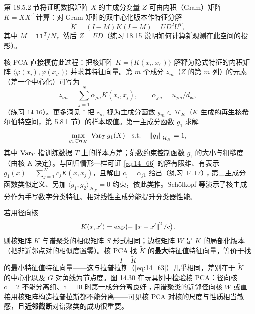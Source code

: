 第 18.5.2 节将证明数据矩阵 $X$ 的主成分变量 $Z$ 可由内积（Gram）矩阵 $K=XX^T$ 计算：对 Gram 矩阵的双中心化版本作特征分解
\begin{equation}
\tilde K = (I-M)K(I-M) = UD^2U^T, \label{eq:14_65}
\end{equation}
其中 $M=\mathbf{1}\mathbf{1}^T/N$，然后 $Z=UD$（练习 18.15 说明如何计算新观测在此空间的投影）。

核 PCA 直接模仿此过程：把核矩阵 $K=\{K(x_i,x_{i'})\}$ 解释为隐式特征的内积矩阵 $\langle\varphi(x_i),\varphi(x_{i'})\rangle$ 并求其特征向量。第 $m$ 个成分 $z_m$（$Z$ 的第 $m$ 列）的元素（差一个中心化）可写为
\[
z_{im} = \sum_{j=1}^{N}\alpha_{jm}K(x_i,x_j),\qquad \alpha_{jm}=u_{jm}/d_m,
\]
（练习 14.16）。更多洞见：把 $z_m$ 视为主成分函数 $g_m\in\mathcal{H}_K$（$K$ 生成的再生核希尔伯特空间，第 5.8.1 节）的样本取值。第一主成分函数 $g_1$ 求解
\begin{equation}
\max_{g_1\in\mathcal{H}_K}\ \mathrm{Var}_T\, g_1(X)\quad \text{s.t.}\quad \left\lVert g_1\right\rVert_{\mathcal{H}_K}=1, \label{eq:14_66}
\end{equation}
其中 $\mathrm{Var}_T$ 指训练数据 $T$ 上的样本方差；范数约束控制函数 $g_1$ 的大小与粗糙度（由核 $K$ 决定）。与回归情形一样可证 \eqref{eq:14_66} 的解有限维、有表示 $g_1(x)=\sum_{j=1}^{N}c_jK(x,x_j)$，且解由 $\hat c_j=\alpha_{j1}$ 给出（练习 14.17）；第二主成分函数类似定义、另加 $\langle g_1,g_2\rangle_{\mathcal{H}_K}=0$ 约束，依此类推。Schölkopf 等演示了核主成分作为手写数字分类特征、相对线性主成分能提升分类器性能。

\begin{remark}
若用径向核
\begin{equation}
K(x,x')=\exp\bigl(-\left\lVert x-x'\right\rVert^2/c\bigr), \label{eq:14_67}
\end{equation}
则核矩阵 $K$ 与谱聚类的相似矩阵 $S$ 形式相同；边权矩阵 $W$ 是 $K$ 的局部化版本（把非近邻点对的相似度置零）。核 PCA 找 $\tilde K$ 的\textbf{最大}特征值特征向量，等价于找
\begin{equation}
I - \tilde K \label{eq:14_68}
\end{equation}
的最小特征值特征向量——这与拉普拉斯（\eqref{eq:14_63}）几乎相同，差别在于 $\tilde K$ 的中心化以及 $G$ 对角线为节点度。图 14.30 在玩具例中检验核 PCA：径向核 $c=2$ 不能分离组、$c=10$ 时第一成分分离良好；用谱聚类的近邻径向核 $W$ 或直接用核矩阵构造拉普拉斯都不能分离——可见核 PCA 对核的尺度与性质相当敏感，且\textbf{近邻截断}对谱聚类的成功很重要。
\end{remark}

